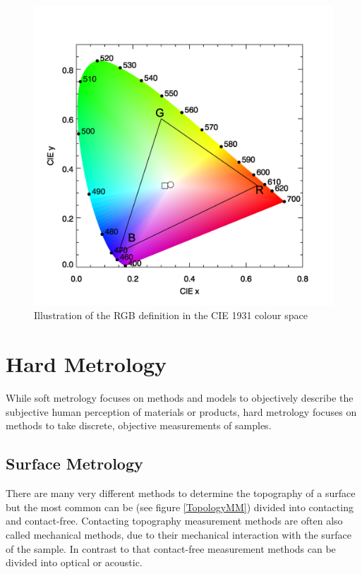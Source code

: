 \begin{figure}
\begin{center}
\includegraphics[width=12cm]{Pictures/CIEColour}
\caption[Illustration of the RGB definition in the CIE 1931 colour space]{Illustration of the RGB definition in the CIE 1931 colour space\cite{OceanOpticsCIE}}
\label{CIE}
\end{center}
\end{figure}






\section{Hard Metrology}
While soft metrology focuses on methods and models to objectively describe the subjective human perception of materials or products, hard metrology focuses on methods to take discrete, objective measurements of samples.

\subsection{Surface Metrology}
There are many very different methods to determine the topography of a surface but the most common can be (see figure \ref{TopologyMM}) divided into contacting and contact-free. Contacting topography measurement methods are often also called mechanical methods, due to their mechanical interaction with the surface of the sample. In contrast to that contact-free measurement methods can be divided into optical or acoustic.

